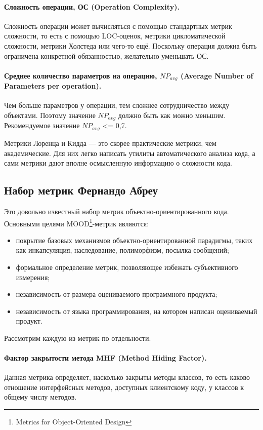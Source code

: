 \documentclass{../../text-style}
\begin{document}
\paragraph{Сложность операции, ОС (Operation Complexity).} Сложность операции может вычисляться с помощью стандартных метрик сложности, то есть с помощью LOC-оценок, метрики цикломатической сложности, метрики Холстеда или чего-то ещё. Поскольку операция должна быть ограничена конкретной обязанностью, желательно уменьшать ОС.

\paragraph{Среднее количество параметров на операцию, $NP_{avg}$ (Average Number of Parameters per operation).} Чем больше параметров у операции, тем сложнее сотрудничество между объектами. Поэтому значение $NP_{avg}$ должно быть как можно меньшим. Рекомендуемое значение $NP_{avg}$ <= 0,7.

Метрики Лоренца и Кидда --- это скорее практические метрики, чем академические. Для них легко написать утилиты автоматического анализа кода, а сами метрики дают вполне осмысленную информацию о сложности кода.

\subsection{Набор метрик Фернандо Абреу}

Это довольно известный набор метрик объектно-ориентированного кода. Основными целями MOOD\footnote{Metrics for Object-Oriented Design}-метрик являются:

\begin{itemize}
    \item покрытие базовых механизмов объектно-ориентированной парадигмы, таких как инкапсуляция, наследование, полиморфизм, посылка сообщений;
    \item формальное определение метрик, позволяющее избежать субъективного измерения;
    \item независимость от размера оцениваемого программного продукта;
    \item независимость от языка программирования, на котором написан оцениваемый продукт.
\end{itemize}

Рассмотрим каждую из метрик по отдельности.

\paragraph{Фактор закрытости метода MHF (Method Hiding Factor).} Данная метрика определяет, насколько закрыты методы классов, то есть каково отношение интерфейсных методов, доступных клиентскому коду, у классов к общему числу методов.
\end{document}
